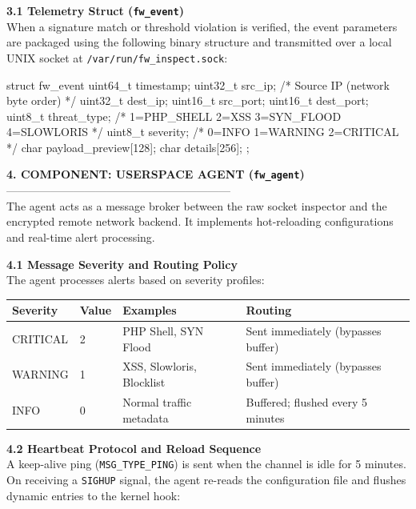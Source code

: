 \documentclass[12pt,a4paper]{article}
\newcommand{\thfmt}[1]{\textbf{#1}}
\begin{document}
\textbf{3.1 Telemetry Struct (\texttt{fw\_event})}\\
When a signature match or threshold violation is verified, the event parameters are packaged using the following binary structure and transmitted over a local UNIX socket at \texttt{/var/run/fw\_inspect.sock}:

\begin{codeblock}
struct fw_event {
    uint64_t  timestamp;
    uint32_t  src_ip;          /* Source IP (network byte order)        */
    uint32_t  dest_ip;
    uint16_t  src_port;
    uint16_t  dest_port;
    uint8_t   threat_type;     /* 1=PHP_SHELL 2=XSS 3=SYN_FLOOD 4=SLOWLORIS */
    uint8_t   severity;        /* 0=INFO  1=WARNING  2=CRITICAL         */
    char      payload_preview[128];
    char      details[256];
};
\end{codeblock}

\vspace{1.5em}
\textbf{4. COMPONENT: USERSPACE AGENT (\texttt{fw\_agent})}\\
------------------------------------------------------------\\
The agent acts as a message broker between the raw socket inspector and the encrypted remote network backend. It implements hot-reloading configurations and real-time alert processing.

\textbf{4.1 Message Severity and Routing Policy}\\
The agent processes alerts based on severity profiles:

\begin{center}
\begin{tabular}{L{3.5cm} C{1.5cm} L{4cm} L{5.4cm}}
\hline
\thfmt{Severity} & \thfmt{Value} & \thfmt{Examples} & \thfmt{Routing} \\
\hline
CRITICAL & 2 & PHP Shell, SYN Flood       & Sent immediately (bypasses buffer) \\
WARNING  & 1 & XSS, Slowloris, Blocklist  & Sent immediately (bypasses buffer) \\
INFO     & 0 & Normal traffic metadata    & Buffered; flushed every 5 minutes \\
\hline
\end{tabular}
\end{center}

\textbf{4.2 Heartbeat Protocol and Reload Sequence}\\
A keep-alive ping (\texttt{MSG\_TYPE\_PING}) is sent when the channel is idle for 5 minutes. On receiving a \texttt{SIGHUP} signal, the agent re-reads the configuration file and flushes dynamic entries to the kernel hook:
\end{document}
